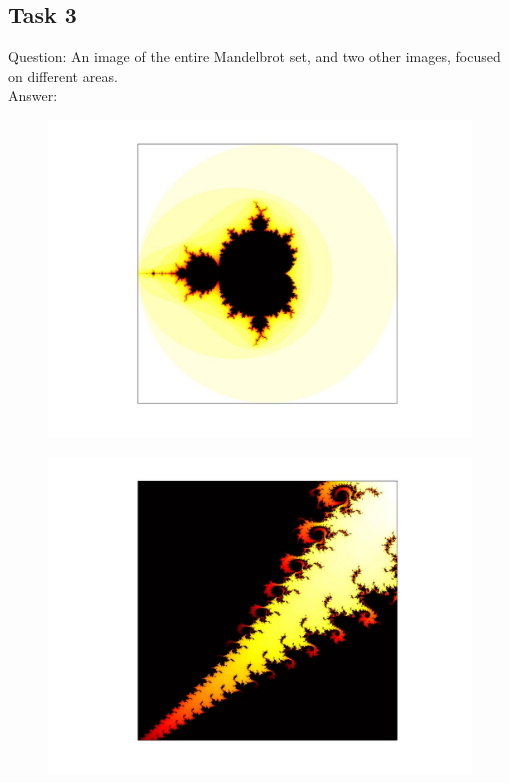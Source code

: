 \documentclass[12pt,a4paper]{report}
\begin{document}
\subsection{Task 3}
Question: An image of the entire Mandelbrot set, and two other images, focused on different areas.
\\
Answer:


\begin{figure}[H]
\centering
\includegraphics[width=\textwidth]{../Code/week 3/fullMadelbrot.jpg} 
\end{figure}

\begin{figure}[H]
\centering
\includegraphics[width=\textwidth]{../Code/week 3/mandelbrot1.jpg} 
\end{figure}
\end{document}
